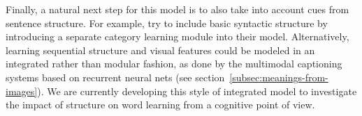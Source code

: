 
Finally, a natural next step for this model is to also take into
account cues from sentence structure. For example,
\cite{alishahi2012concurrent} try to include basic syntactic
structure by introducing a separate category learning module into
their model.  Alternatively, learning sequential structure and visual
features could be modeled in an integrated rather than modular
fashion, as done by the multimodal captioning systems based on
recurrent neural nets (see section~\ref{subsec:meanings-from-images}).
We are currently developing this style of integrated model
to investigate the impact of structure on word learning from a
cognitive point of view.
